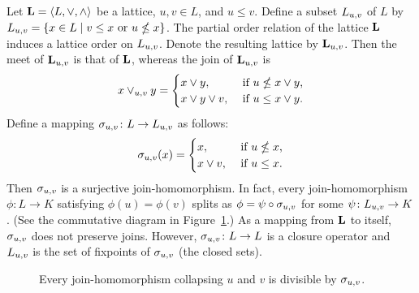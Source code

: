 \begin{example}
  Let $\mathbf{L} = \langle L, \vee, \wedge\rangle$ be a lattice, $u, v \in L$, and $u\leq v$.
  Define a subset $L_{u,v}$ of $L$ by
  $L_{u,v} =\{x\in L \mid v\leq x \text{ or } u \nleq x\}$.
  The partial order relation of the lattice $\mathbf{L}$ induces a lattice order on
  $L_{u,v}$. Denote the resulting lattice by $\mathbf{L}_{u,v}$.
  Then the meet of $\mathbf{L}_{u,v}$ is that of $\mathbf{L}$, whereas the join of $\mathbf{L}_{u,v}$ is
  \[
  x \vee_{u,v} y = 
  \begin{cases}
    x \vee y, & \text{ if $u \nleq x \vee y$,}\\
    x \vee y \vee v, & \text{ if $u \leq x \vee y$.}
  \end{cases}
  \]
  Define a mapping $\sigma_{u,v} \colon L \to L_{u,v}$ as follows:
  \[
  \sigma_{u,v} (x)  = 
  \begin{cases}
    x, & \text{ if $u \nleq x$,}\\
    x \vee v, & \text{ if $u \leq x$.}
  \end{cases}
  \]
  Then $\sigma_{u,v}$ is a surjective join-homomorphism. In fact, every
  join-homomorphism $\phi \colon L \to K$ satisfying $\phi(u) = \phi(v)$ splits as
  $\phi =  \psi \circ \sigma_{u,v}$ for some $\psi \colon L_{u,v} \to K$.
  (See the commutative diagram in Figure~\ref{fig:splitting}.)
  As a mapping from $\mathbf{L}$ to itself, $\sigma_{u,v}$ does not preserve joins. However,
  $\sigma_{u,v} \colon L \to L$ is a closure operator and 
  $L_{u,v}$ is the set of fixpoints of $\sigma_{u,v}$ (the closed sets).

  \begin{center}
    \begin{figure}[h]
      \caption{Every join-homomorphism collapsing $u$ and $v$ is divisible by $\sigma_{u,v}$.}
      \label{fig:splitting}
    \end{figure}
  \end{center}

  
\end{example}


